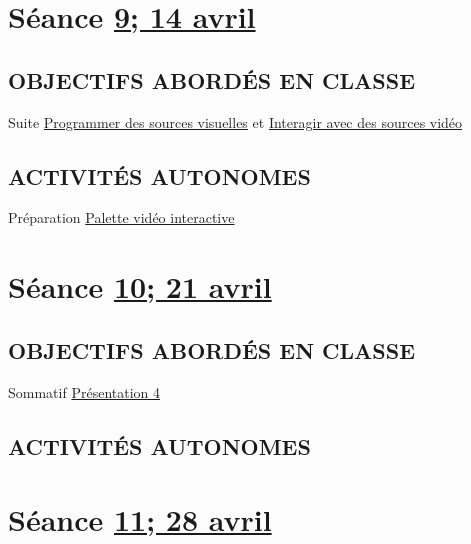 \documentclass[
]{book}
\begin{document}
\hypertarget{semaine_11}{%
\section{\texorpdfstring{Séance \protect\hyperlink{semaine_11}{9; 14 avril}}{Séance 9; 14 avril}}\label{semaine_11}}

\hypertarget{objectifs-aborduxe9s-en-classe-10}{%
\subsection{OBJECTIFS ABORDÉS EN CLASSE}\label{objectifs-aborduxe9s-en-classe-10}}

Suite \protect\hyperlink{programmer}{Programmer des sources visuelles} et \protect\hyperlink{interagir}{Interagir avec des sources vidéo}

\hypertarget{activituxe9s-autonomes-10}{%
\subsection{ACTIVITÉS AUTONOMES}\label{activituxe9s-autonomes-10}}

Préparation \protect\hyperlink{sommatif_4}{Palette vidéo interactive}

\hypertarget{semaine_12}{%
\section{\texorpdfstring{Séance \protect\hyperlink{semaine_12}{10; 21 avril}}{Séance 10; 21 avril}}\label{semaine_12}}

\hypertarget{objectifs-aborduxe9s-en-classe-11}{%
\subsection{OBJECTIFS ABORDÉS EN CLASSE}\label{objectifs-aborduxe9s-en-classe-11}}

Sommatif \protect\hyperlink{sommatif_4}{Présentation 4}

\hypertarget{activituxe9s-autonomes-11}{%
\subsection{ACTIVITÉS AUTONOMES}\label{activituxe9s-autonomes-11}}

\hypertarget{semaine_13}{%
\section{\texorpdfstring{Séance \protect\hyperlink{semaine_13}{11; 28 avril}}{Séance 11; 28 avril}}\label{semaine_13}}
\end{document}
